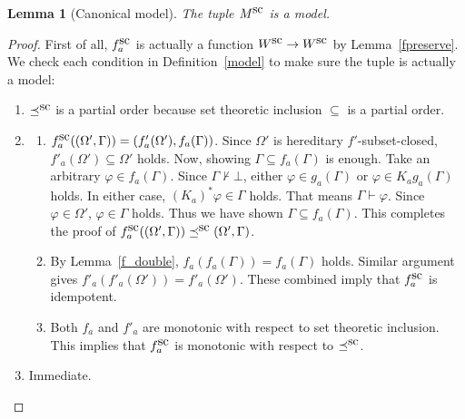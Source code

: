 \documentclass[doctor]{iscs-thesis}
\newtheorem{lemma}{Lemma}
\begin{document}
\begin{lemma}[Canonical model]
The tuple $M^{\mbox{sc}}$ is a model.
\end{lemma}
\begin{proof}
First of all, $f^{\mbox{sc}}_a$ is actually a function $W^{\mbox{sc}}\rightarrow W^{\mbox{sc}}$ by Lemma~\ref{fpreserve}.
We check each condition in Definition~\ref{model} to
 make sure the tuple is actually a model:
 \begin{enumerate}
  \item $\preceq^{\mbox{sc}}$ is a partial order because set theoretic inclusion $\subseteq$ is a
	partial order.
  \item 
\begin{enumerate}
 \item $f^{\mbox{sc}}_a((\Omega', \Gamma)) = (f'_a(\Omega'), f_a(\Gamma))$.
       Since $\Omega'$ is hereditary $f'$-subset-closed,
       $f'_a(\Omega')\subseteq \Omega'$ holds.
       Now, showing $\Gamma\subseteq f_a(\Gamma)$ is enough.
       Take an arbitrary $\varphi\in f_a(\Gamma)$.
       Since $\Gamma\not\vdash\bot$,
       either $\varphi\in g_a(\Gamma)$ or $\varphi\in K_ag_a(\Gamma)$ holds.
       In either case, $(K_a)^*\varphi \in \Gamma$ holds.
       That means $\Gamma\vdash\varphi$.
       Since $\varphi\in\Omega'$, $\varphi \in \Gamma$ holds.
       Thus we have shown $\Gamma\subseteq f_a(\Gamma)$.
       This completes the proof of 
       $f^{\mbox{sc}}_a((\Omega', \Gamma)) \preceq^{\mbox{sc}} (\Omega', \Gamma)$.
 \item By Lemma~\ref{f_double},
       $f_a(f_a(\Gamma)) = f_a(\Gamma)$ holds.
       Similar argument gives $f'_a(f'_a(\Omega')) = f'_a(\Omega')$.
       These combined imply that $f^{\mbox{sc}}_a$ is idempotent.
 \item Both $f_a$ and $f'_a$ are monotonic with respect to set theoretic inclusion.
       This implies that $f^{\mbox{sc}}_a$ is monotonic with respect to $\preceq^{\mbox{sc}}$.
\end{enumerate}
  \item Immediate.
 \end{enumerate}
\end{proof}
\end{document}
